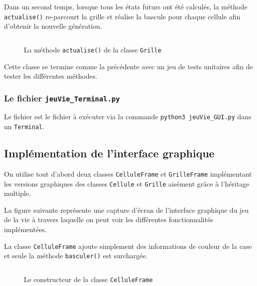 \documentclass[11pt]{article}
\begin{document}
Dans un second temps, lorsque tous les états futurs ont été calculés, la méthode \texttt{actualise()} re-parcourt la grille et réalise la bascule pour chaque cellule afin d'obtenir la nouvelle génération.

\begin{figure}[!h]
\inputminted[numbersep=2pt,linenos=true,frame=single,bgcolor=black!5,firstline=109,lastline=115]{python}{../code/grille.py} \vspace*{-0.5cm}
\caption{La méthode \texttt{actualise()} de la classe \texttt{Grille}}
\end{figure}

Cette classe se termine comme la précédente avec un jeu de tests unitaires afin de tester les différentes méthodes.

\subsubsection{Le fichier \texttt{jeuVie_Terminal.py}}

Le fichier est le fichier à exécuter via la commande \texttt{python3 jeuVie_GUI.py} dans un {\tt Terminal}.

\subsection{Implémentation de l'interface graphique}

On utilise tout d’abord deux classes \texttt{CelluleFrame} et \texttt{GrilleFrame} implémentant les versions graphiques des classes \texttt{Cellule} et \texttt{Grille} aisément grâce à l'héritage multiple.

La figure suivante représente une capture d'écran de l'interface graphique du jeu de la vie à travers laquelle on peut voir les différentes fonctionnalités implémentées.

\bigskip

La classe \texttt{CelluleFrame} ajoute simplement des informations de couleur de la case et seule la méthode \texttt{basculer()} est surchargée. 

\newpage

\begin{figure}[!h]
\inputminted[numbersep=2pt,linenos=true,frame=single,bgcolor=black!5,firstline=14,lastline=24]{python}{../code/celluleFrame.py} \vspace*{-1cm}
\caption{Le constructeur de la classe \texttt{CelluleFrame}}
\end{figure}
\end{document}
